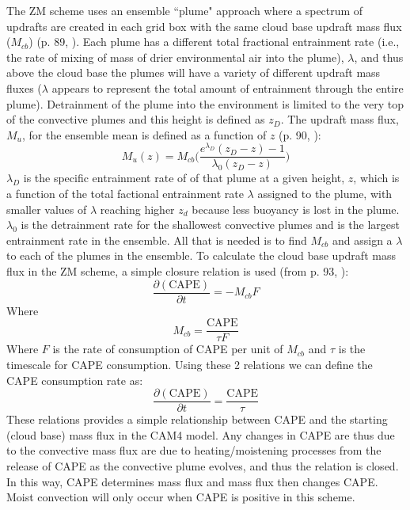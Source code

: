 \documentclass[letterpaper,12pt,titlepage,oneside,final]{book}
\begin{document}
The ZM scheme uses an ensemble ``plume" approach where a spectrum of updrafts are created in each grid box with the same cloud base updraft mass flux ($M_{cb}$) (p. 89, \citep{neale_description_2010}). Each plume has a different total fractional entrainment rate (i.e., the rate of mixing of mass of drier environmental air into the plume), $\lambda$, and thus above the cloud base the plumes will have a variety of different updraft mass fluxes ($\lambda$ appears to represent the total amount of entrainment through the entire plume). Detrainment of the plume into the environment is limited to the very top of the convective plumes and this height is defined as $z_{D}$. The updraft mass flux, $M_{u}$, for the ensemble mean is defined as a function of $z$ (p. 90, \citep{neale_description_2010,zhang_sensitivity_1995}):
\begin{equation}\label{eq:updraft}
M_{u}(z)=M_{cb}\Bigg(\frac{e^{\lambda_{D}}(z_{D}-z)-1}{\lambda_{0}(z_{D}-z)}\Bigg)
\end{equation}
$\lambda_{D}$ is the specific entrainment rate of of that plume at a given height, $z$, which is a function of the total factional entrainment rate $\lambda$ assigned to the plume, with smaller values of $\lambda$ reaching higher $z_{d}$ because less buoyancy is lost in the plume. $\lambda_{0}$ is the detrainment rate for the shallowest convective plumes and is the largest entrainment rate in the ensemble. All that is needed is to find $M_{cb}$ and assign a $\lambda$ to each of the plumes in the ensemble. To calculate the cloud base updraft mass flux in the ZM scheme, a simple closure relation is used (from p. 93, \citep{neale_description_2010}):
\begin{equation}\label{eq:closure}
\frac{\partial{(\text{CAPE})}}{\partial{t}}=-M_{cb}F
\end{equation}
Where
\begin{equation}\label{eq:closure1}
M_{cb}=\frac{\text{CAPE}}{\tau{F}}
\end{equation}
Where $F$ is the rate of consumption of CAPE per unit of $M_{cb}$ and $\tau$ is the timescale for CAPE consumption. Using these 2 relations we can define the CAPE consumption rate as:
\begin{equation}\label{eq:closure2}
\frac{\partial{(\text{CAPE})}}{\partial{t}}=\frac{\text{CAPE}}{\tau}
\end{equation}
These relations provides a simple relationship between CAPE and the starting (cloud base) mass flux in the CAM4 model. Any changes in CAPE are thus due to the convective mass flux are due to heating/moistening processes from the release of CAPE as the convective plume evolves, and thus the relation is closed. In this way, CAPE determines mass flux and mass flux then changes CAPE. Moist convection will only occur when CAPE is positive in this scheme.
\end{document}
